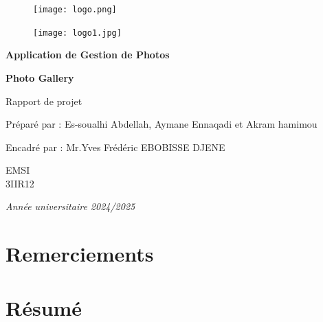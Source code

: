 \documentclass[12pt,a4paper]{report}
\begin{document}
\begin{titlepage}
    \thispagestyle{empty}  %

\vspace*{-1cm}  %

\begin{figure}[t]
    \begin{minipage}{0.05\textwidth}
        \raggedright
        \texttt{[image: logo.png]}
    \end{minipage}
    \hfill
    \begin{minipage}{0.4\textwidth}
        \raggedleft
        \texttt{[image: logo1.jpg]}
    \end{minipage}
\end{figure}

\vspace{1cm}  %
    \centering
    \vspace*{1.5cm}
    {\Huge\bfseries Application de Gestion de Photos\par}
     \vspace{0.5cm}
    {\Large\bfseries Photo Gallery \par}
    \vspace{3cm}
    {\Large Rapport de projet\par}
    \vspace{1cm}
    {\large Préparé par : Es-soualhi Abdellah, Aymane Ennaqadi et Akram hamimou\par}
    \vspace{0.5cm}
    {\large Encadré par : Mr.Yves Frédéric EBOBISSE DJENE \par}
    \vfill
    {\large EMSI\\
    3IIR12\\}
    \vspace{1cm}


    \textit{Année universitaire 2024/2025} 
\end{titlepage}

\tableofcontents
\newpage

\chapter*{Remerciements}

\chapter*{Résumé}
\end{document}
